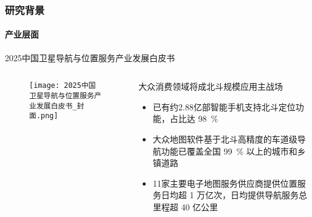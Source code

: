 \begin{frame}[t]
	\frametitle{研究背景} 
	\framesubtitle{产业层面}
	2025中国卫星导航与位置服务产业发展白皮书
	\begin{columns}[t]
		\begin{column}{0.3\textwidth}
		   	\begin{figure}
    			\texttt{[image: 2025中国卫星导航与位置服务产业发展白皮书\_封面.png]}
		   	\end{figure}
		\end{column}   
		\begin{column}{0.7\textwidth}
		    \begin{block}{大众消费领域将成北斗规模应用主战场}
		        \begin{itemize}
		          \item 已有约2.88亿部智能手机支持北斗定位功能，占比达 \SI{98}{\percent}
		          \item 大众地图软件基于北斗高精度的车道级导航功能已覆盖全国 \SI{99}{\percent} 以上的城市和乡镇道路
		          \item 11家主要电子地图服务供应商提供位置服务日均超 1 万亿次，日均提供导航服务总里程超 40 亿公里
		        \end{itemize}
			\end{block}
		\end{column}
	\end{columns}  
\end{frame}
